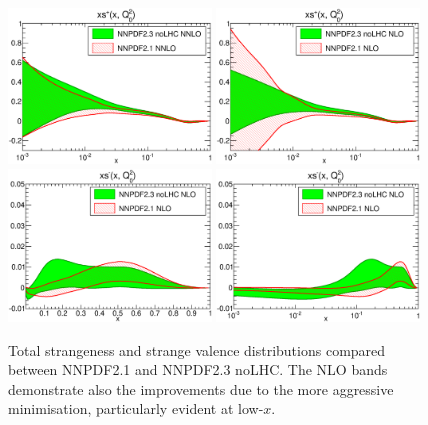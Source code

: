 \clearpage
\begin{figure}[h!]
\centering
\includegraphics[width=0.48\textwidth]{6-LHCimpact/figs/xsp_Q_2_log-21-vs-23noLHC-nnlo.eps}
\includegraphics[width=0.48\textwidth]{6-LHCimpact/figs/xsp_Q_2_log-21-vs-23noLHC.eps}\\
\includegraphics[width=0.48\textwidth]{6-LHCimpact/figs/xsm_Q_2_lin-21-vs-23noLHC.eps}
\includegraphics[width=0.48\textwidth]{6-LHCimpact/figs/xsm_Q_2_log-21-vs-23noLHC.eps}
\caption[Total strangeness and strange valence distributions compared between NNPDF2.1 and NNPDF2.3 noLHC]{Total strangeness and strange valence distributions compared between NNPDF2.1 and NNPDF2.3 noLHC. The NLO bands demonstrate also the improvements due to the more aggressive minimisation, particularly evident at low-$x$.} \label{fig:23noLHCvs21_strangeness}
\end{figure}

